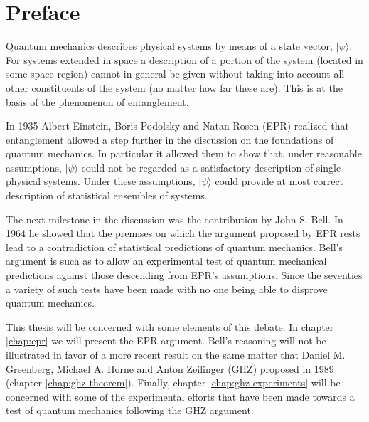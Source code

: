 \chapter*{Preface}
Quantum mechanics describes physical systems by means of a state vector, $| \psi \rangle$. For systems extended in space a description of a portion of the system (located in some space region) cannot in general be given without taking into account all other constituents of the system (no matter how far these are). This is at the basis of the phenomenon of entanglement.

In 1935 Albert Einstein, Boris Podolsky and Natan Rosen (EPR) realized that entanglement allowed a step further in the discussion on the foundations of quantum mechanics. In particular it allowed them to show that, under reasonable assumptions, $| \psi \rangle$ could not be regarded as a satisfactory description of single physical systems. Under these assumptions, $| \psi \rangle$ could provide at most correct description of statistical ensembles of systems.

The next milestone in the discussion was the contribution by John S. Bell. In 1964 he showed that the premises on which the argument proposed by EPR rests lead to a contradiction of statistical predictions of quantum mechanics. Bell's argument is such as to allow an experimental test of quantum mechanical predictions against those descending from EPR's assumptions. Since the seventies a variety of such tests have been made with no one being able to disprove quantum mechanics.

This thesis will be concerned with some elements of this debate. In chapter \ref{chap:epr} we will present the EPR argument. Bell's reasoning will not be illustrated in favor of a more recent result on the same matter that Daniel M. Greenberg, Michael A. Horne and Anton Zeilinger (GHZ) proposed in 1989 (chapter \ref{chap:ghz-theorem}). Finally, chapter \ref{chap:ghz-experiments} will be concerned with some of the experimental efforts that have been made towards a test of quantum mechanics following the GHZ argument.
